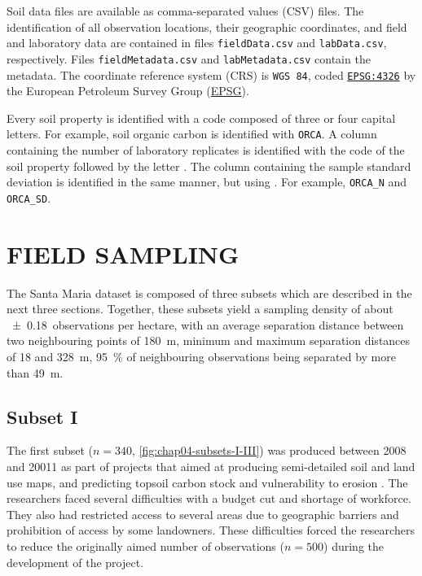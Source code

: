 \def\wgs{\href{http://spatialreference.org/ref/epsg/4326/}{\texttt{EPSG:4326}}}

Soil data files are available as comma-separated values (CSV) files. The identification of all observation 
locations, their geographic coordinates, and field and laboratory data are contained in files 
\texttt{fieldData.csv} and \texttt{labData.csv}, respectively. Files \texttt{fieldMetadata.csv} and 
\texttt{labMetadata.csv} contain the metadata. The coordinate reference system (CRS) is \texttt{WGS 84}, coded 
\wgs{} by the European Petroleum Survey Group (\href{http://www.epsg.org/}{EPSG}).

Every soil property is identified with a code composed of three or four capital letters. For example, soil 
organic carbon is identified with \texttt{ORCA}. A column containing the number of laboratory replicates is 
identified with the code of the soil property followed by the letter . The column containing the sample 
standard deviation is identified in the same manner, but using . For example, \texttt{ORCA\_N} and 
\texttt{ORCA\_SD}.

\section{FIELD SAMPLING}
\label{sec:chap04-sampling}

The Santa Maria dataset is composed of three subsets which are described in the next three sections. Together, 
these subsets yield a sampling density of about \num{\pm0.18}~observations per hectare, with an average 
separation distance between two neighbouring points of \SI{180}{\metre}, minimum and maximum separation 
distances of \num{18} and \SI{328}{\metre}, \SI{95}{\percent} of neighbouring observations being separated by 
more than \SI{49}{\metre}.

\subsection{Subset I}

The first subset ($n = 340$, \autoref{fig:chap04-subsets-I-III}) was produced between 2008 and 20011 as part 
of projects that aimed at producing semi-detailed soil and land use maps, and predicting topsoil carbon stock 
and vulnerability to erosion \cite{Samuel-Rosa2009, SamuelRosaEtAl2011a, MiguelEtAl2012, Moura-BuenoEtAl2012, 
Samuel-RosaEtAl2013}. The researchers faced several difficulties with a budget cut and shortage of workforce. 
They also had restricted access to several areas due to geographic barriers and prohibition of access by some 
landowners. These difficulties forced the researchers to reduce the originally aimed number of observations 
($n = 500$) during the development of the project.

